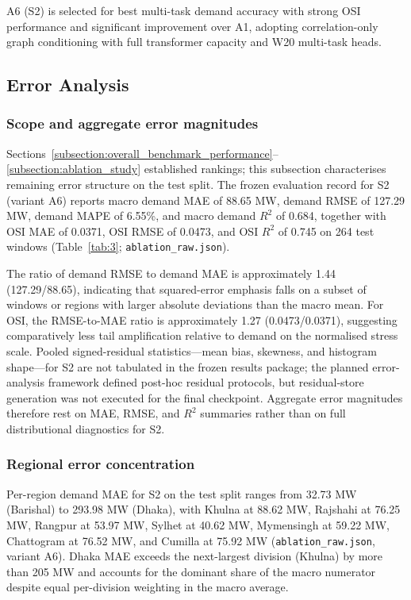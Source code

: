 A6 (S2) is selected for best multi-task demand accuracy with strong OSI performance and significant improvement over A1, adopting correlation-only graph conditioning with full transformer capacity and W20 multi-task heads.

\subsection{Error Analysis}\label{subsection:error_analysis}

\subsubsection{Scope and aggregate error magnitudes}\label{subsubsection:scope_and_aggregate_error_magnitudes}

Sections~\ref{subsection:overall_benchmark_performance}--\ref{subsection:ablation_study} established rankings; this subsection characterises remaining error structure on the test split. The frozen evaluation record for S2 (variant A6) reports macro demand MAE of 88.65 MW, demand RMSE of 127.29 MW, demand MAPE of 6.55\%, and macro demand $R^2$ of 0.684, together with OSI MAE of 0.0371, OSI RMSE of 0.0473, and OSI $R^2$ of 0.745 on 264 test windows (Table~\ref{tab:3}; \texttt{ablation\_raw.json}).

The ratio of demand RMSE to demand MAE is approximately 1.44 (127.29/88.65), indicating that squared-error emphasis falls on a subset of windows or regions with larger absolute deviations than the macro mean. For OSI, the RMSE-to-MAE ratio is approximately 1.27 (0.0473/0.0371), suggesting comparatively less tail amplification relative to demand on the normalised stress scale. Pooled signed-residual statistics---mean bias, skewness, and histogram shape---for S2 are not tabulated in the frozen results package; the planned error-analysis framework defined post-hoc residual protocols, but residual-store generation was not executed for the final checkpoint. Aggregate error magnitudes therefore rest on MAE, RMSE, and $R^2$ summaries rather than on full distributional diagnostics for S2.

\subsubsection{Regional error concentration}\label{subsubsection:regional_error_concentration}

Per-region demand MAE for S2 on the test split ranges from 32.73 MW (Barishal) to 293.98 MW (Dhaka), with Khulna at 88.62 MW, Rajshahi at 76.25 MW, Rangpur at 53.97 MW, Sylhet at 40.62 MW, Mymensingh at 59.22 MW, Chattogram at 76.52 MW, and Cumilla at 75.92 MW (\texttt{ablation\_raw.json}, variant A6). Dhaka MAE exceeds the next-largest division (Khulna) by more than 205 MW and accounts for the dominant share of the macro numerator despite equal per-division weighting in the macro average.

